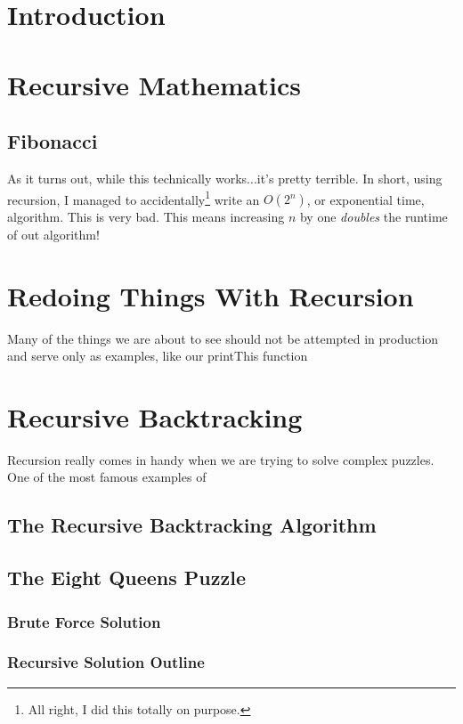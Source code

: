\documentclass[10pt,a4paper]{book}
\begin{document}
\section{Introduction}

\section{Recursive Mathematics}

\subsection{Fibonacci}
As it turns out, while this technically works...it's pretty terrible.  In short, using recursion, I managed to accidentally\footnote{All right, I did this totally on purpose.} write an $ O(2^n) $, or exponential time,  algorithm.  This is very bad.  This means increasing $ n $ by one \emph{doubles} the runtime of out algorithm!


\section{Redoing Things With Recursion}
Many of the things we are about to see should not be attempted in production and serve only as examples, like our printThis function





\section{Recursive Backtracking}
Recursion really comes in handy when we are trying to solve complex puzzles.
One of the most famous examples of 

\subsection*{The Recursive Backtracking Algorithm}




\subsection{The Eight Queens Puzzle}

\subsubsection{Brute Force Solution}

\subsubsection{Recursive Solution Outline}
\end{document}
